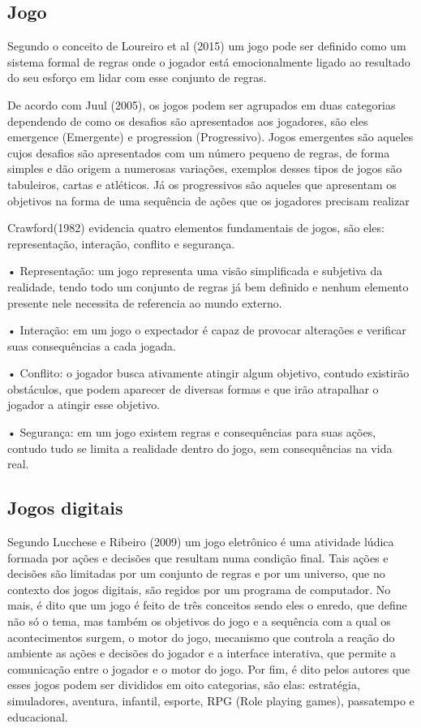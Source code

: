 \documentclass[12pt]{article}
\begin{document}
\subsection{Jogo}

Segundo o conceito de Loureiro et al (2015) um jogo pode ser definido como um sistema formal de regras onde o jogador está emocionalmente ligado ao resultado do seu esforço em lidar com esse conjunto de regras.

De acordo com Juul (2005), os jogos podem ser agrupados em duas categorias dependendo de como os desafios são apresentados aos jogadores, são eles emergence (Emergente) e progression (Progressivo).  Jogos emergentes são aqueles cujos desafios são apresentados com um número pequeno de regras, de forma simples e dão origem a numerosas variações, exemplos desses tipos de jogos são tabuleiros, cartas e atléticos. Já os progressivos são aqueles que apresentam os objetivos na forma de uma sequência de ações que os jogadores precisam realizar

Crawford(1982) evidencia quatro elementos fundamentais de jogos, são eles: representação, interação, conflito e segurança.

•	Representação: um jogo representa uma visão simplificada e subjetiva da realidade, tendo todo um conjunto de regras já bem definido e nenhum elemento presente nele necessita de referencia ao mundo externo.

•	Interação: em um jogo o expectador é capaz de provocar alterações e verificar suas consequências a cada jogada.

•	Conflito: o jogador busca ativamente atingir algum objetivo, contudo existirão obstáculos, que podem aparecer de diversas formas e que irão atrapalhar o jogador a atingir esse objetivo.

•	Segurança: em um jogo existem regras e consequências para suas ações, contudo tudo se limita a realidade dentro do jogo, sem consequências na vida real.

\subsection{Jogos digitais}

Segundo Lucchese e Ribeiro (2009) um jogo eletrônico é uma atividade lúdica formada por ações e decisões que resultam numa condição final. Tais ações e decisões são limitadas por um conjunto de regras e por um universo, que no contexto dos jogos digitais, são regidos por um programa de computador. No mais, é dito que um jogo é feito de três conceitos sendo eles o enredo, que define não só o tema, mas também os objetivos do jogo e a sequência com a qual os acontecimentos surgem, o motor do jogo, mecanismo que controla a reação do ambiente as ações e decisões do jogador e a interface interativa, que permite a comunicação entre o jogador e o motor do jogo. Por fim, é dito pelos autores que esses jogos podem ser divididos em oito categorias, são elas: estratégia, simuladores, aventura, infantil, esporte, RPG (Role playing games), passatempo e educacional.
\end{document}
